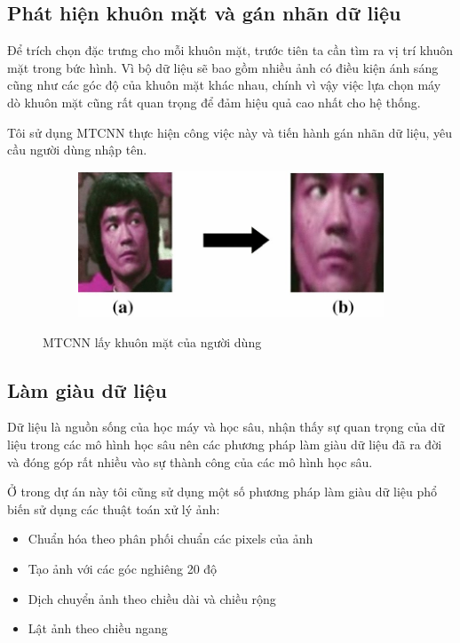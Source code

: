 \subsection{Phát hiện khuôn mặt và gán nhãn dữ liệu}
Để trích chọn đặc trưng cho mỗi khuôn mặt, trước tiên ta cần tìm ra
vị trí khuôn mặt trong bức hình. Vì bộ dữ liệu sẽ bao gồm nhiều ảnh
có điều kiện ánh sáng cũng như các góc độ của khuôn mặt khác nhau,
chính vì vậy việc lựa chọn máy dò khuôn mặt cũng rất quan trọng để đảm
hiệu quả cao nhất cho hệ thống.

Tôi sử dụng MTCNN thực hiện công việc này và tiến hành gán nhãn dữ liệu,
yêu cầu người dùng nhập tên.

\begin{figure}
    \begin{subfigure}{0.6\textwidth}
        \includegraphics[width=1\linewidth]{Chapters/items/chap3_3.jpg}
        \label{fig:chap3_3}
    \end{subfigure}
    \caption{MTCNN lấy khuôn mặt của người dùng}
\end{figure}

\newpage
\subsection{Làm giàu dữ liệu}

Dữ liệu là nguồn sống của học máy và học sâu, nhận thấy sự quan trọng của dữ liệu
trong các mô hình học sâu nên các phương pháp làm giàu dữ liệu đã ra đời và đóng góp rất nhiều
vào sự thành công của các mô hình học sâu.



Ở trong dự án này tôi cũng sử dụng một số phương pháp làm giàu dữ liệu phổ biến sử dụng các thuật toán xử lý ảnh:
\begin{itemize}
    \item Chuẩn hóa theo phân phối chuẩn các pixels của ảnh
    \item Tạo ảnh với các góc nghiêng 20 độ
    \item Dịch chuyển ảnh theo chiều dài và chiều rộng
    \item Lật ảnh theo chiều ngang
\end{itemize}

